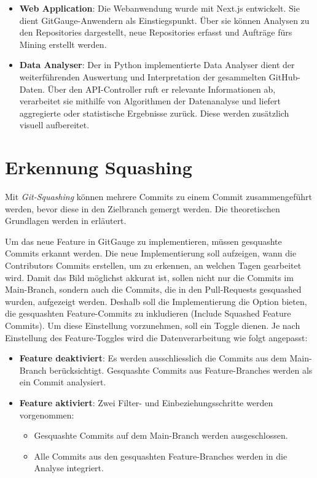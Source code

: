 \begin{itemize}
    \item \textbf{Web Application}: Die Webanwendung wurde mit Next.js entwickelt. Sie dient GitGauge-Anwendern als Einstiegspunkt. Über sie können Analysen zu den Repositories dargestellt, neue Repositories erfasst und Aufträge fürs Mining erstellt werden. 
    \item \textbf{Data Analyser}:  Der in Python implementierte Data Analyser dient der weiterführenden Auswertung und Interpretation der gesammelten GitHub-Daten. Über den API-Controller ruft er relevante Informationen ab, verarbeitet sie mithilfe von Algorithmen der Datenanalyse und liefert aggregierte oder statistische Ergebnisse zurück. Diese werden zusätzlich visuell aufbereitet.
\end{itemize}



\section{Erkennung Squashing}
Mit \textit{Git-Squashing} können mehrere Commits zu einem Commit zusammengeführt werden, bevor diese in den Zielbranch gemergt werden. Die theoretischen Grundlagen werden in  erläutert. 

Um das neue Feature in GitGauge zu implementieren, müssen gesquashte Commits erkannt werden. Die neue Implementierung soll aufzeigen, wann die Contributors Commits erstellen, um zu erkennen, an welchen Tagen gearbeitet wird. Damit das Bild möglichst akkurat ist, sollen nicht nur die Commits im Main-Branch, sondern auch die Commits, die in den Pull-Requests gesquashed wurden, aufgezeigt werden. Deshalb soll die Implementierung die Option bieten, die gesquashten Feature-Commits zu inkludieren (Include Squashed Feature Commits). Um diese Einstellung vorzunehmen, soll ein Toggle dienen. Je nach Einstellung des Feature-Toggles wird die Datenverarbeitung wie folgt angepasst: \\
\begin{itemize}
    \item \textbf{Feature deaktiviert}: Es werden ausschliesslich die Commits aus dem Main-Branch berücksichtigt. Gesquashte Commits aus Feature-Branches werden als ein Commit analysiert.
    \item \textbf{Feature aktiviert}: Zwei Filter- und Einbeziehungsschritte werden vorgenommen:
        \begin{itemize}
        \item Gesquashte Commits auf dem Main-Branch werden ausgeschlossen.
        \item Alle Commits aus den gesquashten Feature-Branches werden in die Analyse integriert.
    \end{itemize}
\end{itemize}


